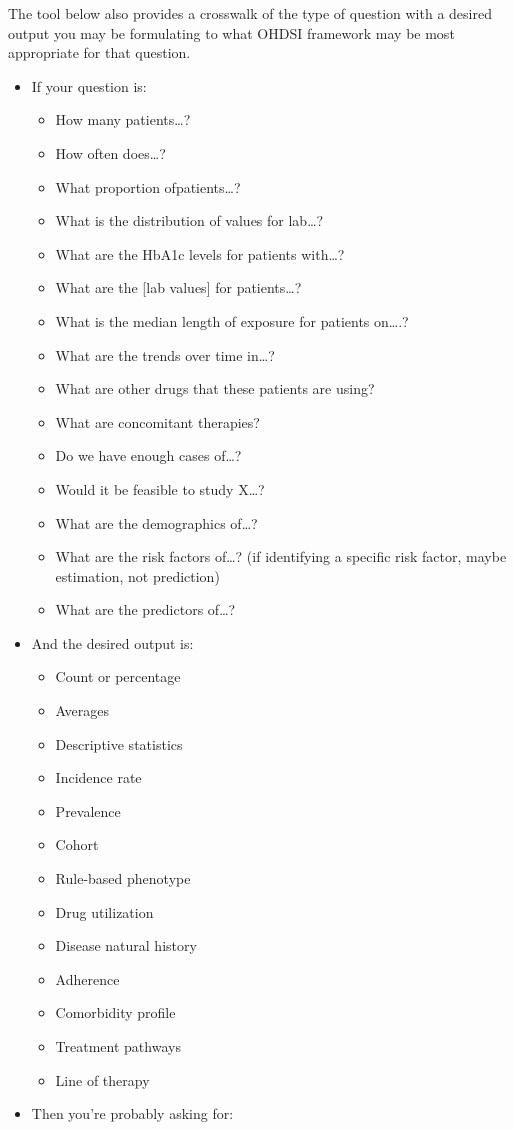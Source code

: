 \documentclass[11pt]{book}
\providecommand{\tightlist}{%
  \setlength{\itemsep}{0pt}\setlength{\parskip}{0pt}}
\theoremstyle{definition}
\theoremstyle{definition}
\theoremstyle{definition}
\theoremstyle{remark}
\begin{document}
The tool below also provides a crosswalk of the type of question with a desired output you may be formulating to what OHDSI framework may be most appropriate for that question.

\begin{itemize}
\tightlist
\item
  If your question is:

  \begin{itemize}
  \tightlist
  \item
    How many patients\ldots?
  \item
    How often does\ldots?
  \item
    What proportion ofpatients\ldots?
  \item
    What is the distribution of values for lab\ldots?
  \item
    What are the HbA1c levels for patients with\ldots?
  \item
    What are the {[}lab values{]} for patients\ldots?
  \item
    What is the median length of exposure for patients on\ldots.?
  \item
    What are the trends over time in\ldots?
  \item
    What are other drugs that these patients are using?
  \item
    What are concomitant therapies?
  \item
    Do we have enough cases of\ldots?
  \item
    Would it be feasible to study X\ldots?
  \item
    What are the demographics of\ldots?
  \item
    What are the risk factors of\ldots? (if identifying a specific risk factor, maybe estimation, not prediction)
  \item
    What are the predictors of\ldots?
  \end{itemize}
\item
  And the desired output is:

  \begin{itemize}
  \tightlist
  \item
    Count or percentage
  \item
    Averages
  \item
    Descriptive statistics
  \item
    Incidence rate
  \item
    Prevalence
  \item
    Cohort
  \item
    Rule-based phenotype
  \item
    Drug utilization
  \item
    Disease natural history
  \item
    Adherence
  \item
    Comorbidity profile
  \item
    Treatment pathways
  \item
    Line of therapy
  \end{itemize}
\item
  Then you're probably asking for:


\end{itemize}
\end{document}
